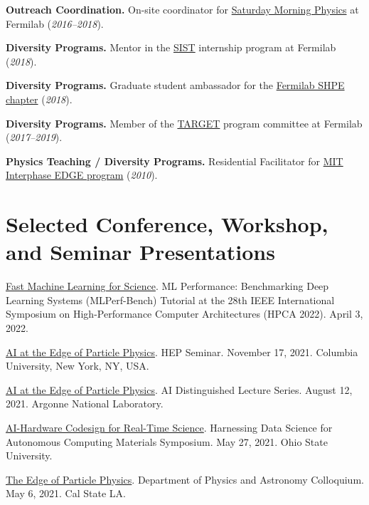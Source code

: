 \documentclass{res}
\newcommand{\MarginText}[1]{\section{#1}\vspace{10pt}}
\begin{document}
\begin{resume}
  \textbf{Outreach Coordination.} On-site coordinator for \href{http://saturdaymorningphysics.fnal.gov/}{Saturday Morning Physics} at Fermilab (\textit{2016--2018}).

  \textbf{Diversity Programs.} Mentor in the \href{http://diversity.fnal.gov/sist/}{SIST} internship program at Fermilab (\textit{2018}).

  \textbf{Diversity Programs.} Graduate student ambassador for the \href{http://diversity.fnal.gov/fshpe/}{Fermilab SHPE chapter} (\textit{2018}).

  \textbf{Diversity Programs.} Member of the \href{http://diversity.fnal.gov/target/}{TARGET} program committee at Fermilab (\textit{2017--2019}).

  \textbf{Physics Teaching / Diversity Programs.} Residential Facilitator for \href{http://ome.mit.edu/programs-services/program-overview}{MIT Interphase EDGE program} (\textit{2010}).


  \MarginText{Selected Conference, Workshop, and Seminar Presentations}

  \href{https://sites.google.com/g.harvard.edu/mlperf-bench-hpca22/home}{Fast Machine Learning for Science}. ML Performance: Benchmarking Deep Learning Systems (MLPerf-Bench) Tutorial at the 28th IEEE International Symposium on High-Performance Computer Architectures (HPCA 2022). April 3, 2022.

  \href{https://physics.columbia.edu/events/hep-seminar-dr-javier-duarte-ucsd}{AI at the Edge of Particle Physics}. HEP Seminar. November 17, 2021. Columbia University, New York, NY, USA.

  \href{https://www.anl.gov/event/ai-at-the-edge-of-particle-physics}{AI at the Edge of Particle Physics}. AI Distinguished Lecture Series. August 12, 2021. Argonne National Laboratory.

  \href{https://tdai.osu.edu/events/acm-symposium-harnessing-data-science-autonomous-computing-materials}{AI-Hardware Codesign for Real-Time Science}. Harnessing Data Science for Autonomous Computing Materials Symposium. May 27, 2021. Ohio State University.

  \href{https://www.calstatela.edu/dept/physics/colloquia-and-events}{The Edge of Particle Physics}. Department of Physics and Astronomy Colloquium. May 6, 2021. Cal State LA.


\end{resume}
\end{document}
